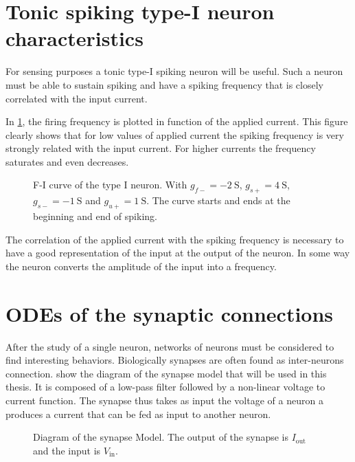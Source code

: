\section{Tonic spiking type-I neuron characteristics}

For sensing purposes a tonic type-I spiking neuron will be useful. Such a neuron must be able to sustain spiking and have a spiking frequency that is closely correlated with the input current.

In \cref{fig:neuron_spiking}, the firing frequency is plotted in function of the applied current. This figure clearly shows that for low values of applied current the spiking frequency is very strongly related with the input current. For higher currents the frequency saturates and even decreases.

\begin{figure}[!htb]
    \centering
    \caption{F-I curve of the type I neuron. With $g_{f-}=\qty{-2}{\siemens}$, $g_{s+}=\qty{4}{\siemens}$, $g_{s-}=\qty{-1}{\siemens}$ and $g_{u+}=\qty{1}{\siemens}$. The curve starts and ends at the beginning and end of spiking.}
    \label{fig:neuron_spiking}
\end{figure}

The correlation of the applied current with the spiking frequency is necessary to have a good representation of the input at the output of the neuron. In some way the neuron converts the amplitude of the input into a frequency. 

\section{ODEs of the synaptic connections}

After the study of a single neuron, networks of neurons must be considered to find interesting behaviors. Biologically synapses are often found as inter-neurons connection.  show the diagram of the synapse model that will be used in this thesis. It is composed of a low-pass filter followed by a non-linear voltage to current function. The synapse thus takes as input the voltage of a neuron a produces a current that can be fed as input to another neuron.

\begin{figure}[!htb]
    \centering
    \caption{Diagram of the synapse Model. The output of the synapse is $I_\text{out}$ and the input is $V_\text{in}$.}
    \label{fig:synapse_mod}
\end{figure}


